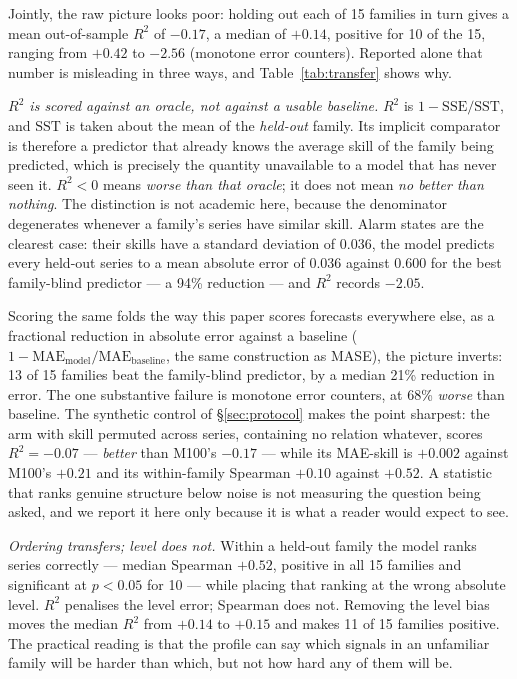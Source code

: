 \documentclass[11pt,a4paper]{article}
\newcommand{\num}[1]{#1}
\begin{document}
Jointly, the raw picture looks poor: holding out each of \num{15} families in
turn gives a mean out-of-sample \(R^2\) of \(-0.17\), a median of \(+0.14\),
positive for \num{10} of the \num{15}, ranging from \(+0.42\) to \(-2.56\)
(monotone error counters). Reported alone that number is
misleading in three ways, and Table~\ref{tab:transfer} shows why.

\emph{\(R^2\) is scored against an oracle, not against a usable baseline.}
\(R^2\) is \(1-\mathrm{SSE}/\mathrm{SST}\), and \(\mathrm{SST}\) is taken about
the mean of the \emph{held-out} family. Its implicit comparator is therefore a
predictor that already knows the average skill of the family being predicted,
which is precisely the quantity unavailable to a model that has never seen it.
\(R^2<0\) means \emph{worse than that oracle}; it does not mean \emph{no better
than nothing}. The distinction is not academic here, because the denominator
degenerates whenever a family's series have similar skill. Alarm states are the
clearest case: their skills have a standard deviation of \num{0.036}, the model
predicts every held-out series to a mean absolute error of \num{0.036} against
\num{0.600} for the best family-blind predictor --- a \num{94}\% reduction ---
and \(R^2\) records \(-2.05\).

Scoring the same folds the way this paper scores forecasts everywhere else, as
a fractional reduction in absolute error against a baseline
(\(1-\mathrm{MAE}_{\text{model}}/\mathrm{MAE}_{\text{baseline}}\), the same
construction as MASE), the picture inverts: \num{13} of \num{15} families beat
the family-blind predictor, by a median \num{21}\% reduction in error. The one
substantive failure is monotone error counters, at \num{68}\% \emph{worse} than
baseline. The synthetic control of \S\ref{sec:protocol} makes the point sharpest:
the arm with skill permuted across series, containing no relation whatever,
scores \(R^2=-0.07\) --- \emph{better} than M100's \(-0.17\) --- while its
MAE-skill is \(+0.002\) against M100's \(+0.21\) and its within-family Spearman
\(+0.10\) against \(+0.52\). A statistic that ranks genuine structure below
noise is not measuring the question being asked, and we report it here only
because it is what a reader would expect to see.

\emph{Ordering transfers; level does not.} Within a held-out family the model
ranks series correctly --- median Spearman \(+0.52\), positive in all
\num{15} families and significant at \(p<0.05\) for \num{10} --- while
placing that ranking at the wrong absolute level. \(R^2\) penalises the level
error; Spearman does not. Removing the level bias moves the median \(R^2\) from
\(+0.14\) to \(+0.15\) and makes \num{11} of \num{15} families positive. The
practical reading is that the profile can say which signals in an unfamiliar
family will be harder than which, but not how hard any of them will be.
\end{document}
